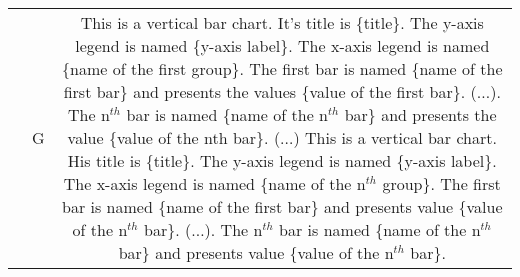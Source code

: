 \begin{table}[htbp]
\begin{tabular}{|c|c|c|}
& \multirow{6}{*}{G} & \multirow{6}{15cm}{This is a vertical bar chart. It's title is \{title\}. The y-axis legend is named \{y-axis label\}. The x-axis legend is named \{name of the first group\}. The first bar is named \{name of the first bar\} and presents the values \{value of the first bar\}. ($\ldots$). The n$^{th}$ bar is named \{name of the n$^{th}$ bar\} and presents the value \{value of the nth bar\}. ($\ldots$) This is a vertical bar chart. His title is \{title\}. The y-axis legend is named \{y-axis label\}. The x-axis legend is named \{name of the n$^{th}$ group\}. The first bar is named \{name of the first bar\} and presents value \{value of the n$^{th}$ bar\}. ($\ldots$). The n$^{th}$ bar is named \{name of the n$^{th}$ bar\} and presents value \{value of the n$^{th}$ bar\}.}\\
& &\\
& & \\
& &\\
& &\\
& &\\

\hline
\hline

\end{tabular}
\end{table}